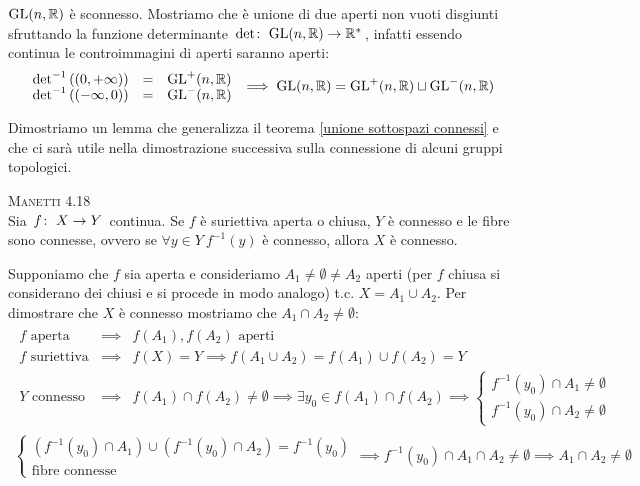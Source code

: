 \begin{observe}
	$\operatorname{GL}(n,\mathbb{R})$ è sconnesso. Mostriamo che è unione di due aperti non vuoti disgiunti sfruttando la funzione determinante $\funz \det {\gl(n,\realset)} {\realset^*}$, infatti essendo continua  le controimmagini di aperti saranno aperti:
		\begin{gather*}
			\begin{array}{lcl}
				\det^{-1} \left( (0,+\infty)\right) & = & \gl ^+ (n,\realset) \\ 
				\det^{-1} \left( (-\infty,0)\right) & = & \gl ^- (n,\realset) \\
			\end{array}
		\implies \gl(n,\realset)=\gl^+(n,\realset) \sqcup \gl^-(n,\realset)
		\end{gather*}
\end{observe}
 Dimostriamo un lemma che generalizza il teorema \ref{unione sottospazi connessi}
 e che ci sarà utile nella dimostrazione successiva sulla connessione di alcuni gruppi topologici.
\begin{lemming} \textsc{Manetti 4.18} \\
	Sia $\funz f X Y$ continua. Se $f$ è suriettiva aperta o chiusa, $Y$ è connesso e le fibre sono connesse, ovvero se $\forall y\in Y \ f^{-1}(y)$ è connesso, allora $X$ è connesso.
\end{lemming}
\begin{demonstration}
	Supponiamo che $f$ sia aperta e consideriamo $A_1\neq\emptyset\neq A_2$ aperti (per $f$ chiusa si considerano dei chiusi e si procede in modo analogo) t.c. $X=A_1\cup A_2$. Per dimostrare che $X$ è connesso mostriamo che $A_1\cap A_2\neq\emptyset$:
		\begin{gather*}
			\begin{array}{lcl}
				f \text{ aperta } & \implies & f(A_1), f(A_2) \text{ aperti}\\
				f \text{ suriettiva} & \implies & f(X)=Y \implies f(A_1\cup A_2)=f(A_1)\cup f(A_2)=Y \\
				Y \text{ connesso } & \implies & f(A_1)\cap f(A_2)\neq\emptyset \implies \exists y_0\in f(A_1)\cap f(A_2) \implies \begin{cases} 
					f^{-1}(y_0) \cap A_1\neq \emptyset \\
					f^{-1}(y_0) \cap A_2\neq \emptyset 
				\end{cases}
			\end{array} \\
				\begin{cases}
					\left( f^{-1}(y_0)\cap A_1 \right)\cup \left( f^{-1}(y_0)\cap A_2 \right)=f^{-1}(y_0) \\
					\text{fibre connesse }
				\end{cases}
				 \implies  f^{-1}(y_0)\cap A_1\cap A_2\neq\emptyset \implies A_1\cap A_2\neq\emptyset
		\end{gather*}
\end{demonstration}

